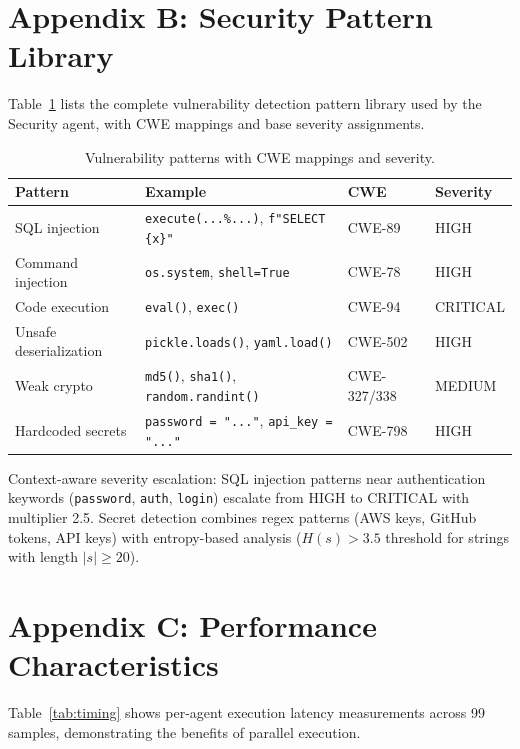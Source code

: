 \documentclass[10pt,twocolumn]{article}
\begin{document}
\section{Appendix B: Security Pattern Library}

Table~\ref{tab:security_patterns} lists the complete vulnerability detection pattern library used by the Security agent, with CWE mappings and base severity assignments.

\begin{table}[h]
\centering
\caption{Vulnerability patterns with CWE mappings and severity.}
\label{tab:security_patterns}
\small
\begin{tabular}{@{}llll@{}}
\toprule
\textbf{Pattern} & \textbf{Example} & \textbf{CWE} & \textbf{Severity} \\
\midrule
SQL injection & \texttt{execute(...\%...)}, \texttt{f"SELECT \{x\}"} & CWE-89 & HIGH \\
Command injection & \texttt{os.system}, \texttt{shell=True} & CWE-78 & HIGH \\
Code execution & \texttt{eval()}, \texttt{exec()} & CWE-94 & CRITICAL \\
Unsafe deserialization & \texttt{pickle.loads()}, \texttt{yaml.load()} & CWE-502 & HIGH \\
Weak crypto & \texttt{md5()}, \texttt{sha1()}, \texttt{random.randint()} & CWE-327/338 & MEDIUM \\
Hardcoded secrets & \texttt{password = "..."}, \texttt{api\_key = "..."} & CWE-798 & HIGH \\
\bottomrule
\end{tabular}
\end{table}

Context-aware severity escalation: SQL injection patterns near authentication keywords (\texttt{password}, \texttt{auth}, \texttt{login}) escalate from HIGH to CRITICAL with multiplier 2.5. Secret detection combines regex patterns (AWS keys, GitHub tokens, API keys) with entropy-based analysis ($H(s) > 3.5$ threshold for strings with length $|s| \geq 20$).

\section{Appendix C: Performance Characteristics}

Table~\ref{tab:timing} shows per-agent execution latency measurements across 99 samples, demonstrating the benefits of parallel execution.
\end{document}
